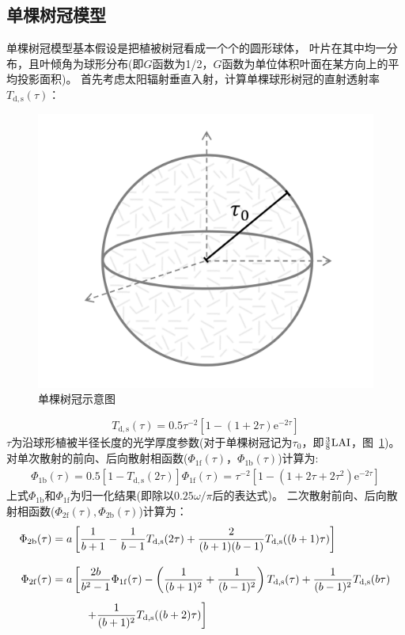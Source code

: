 \subsection{单棵树冠模型}
单棵树冠模型基本假设是把植被树冠看成一个个的圆形球体，
叶片在其中均一分布，且叶倾角为球形分布(即$G$函数为1/2，$G$函数为单位体积叶面在某方向上的平均投影面积)。
首先考虑太阳辐射垂直入射，计算单棵球形树冠的直射透射率$T_{\mathrm{d,s}}\left(\tau\right)$：
{
  \begin{figure}[htbp]
    \centering
    \includegraphics[width=0.6\columnwidth]{Figures/辐射过程及辐射通量计算/单棵树冠示意图.png}
    \caption{单棵树冠示意图}
    \label{fig:单棵树冠示意图}
  \end{figure}
}
%
\begin{equation}\label{T_ds_tau}
  T_{\mathrm{d, s}}(\tau)=0.5 \tau^{-2}\left[1-(1+2 \tau) {\mathrm e}^{-2 \tau}\right]
\end{equation}
$\tau$为沿球形植被半径长度的光学厚度参数(对于单棵树冠记为$\tau_0$，即$\frac{3}{8}\rm{LAI}$，图~\ref{fig:单棵树冠示意图})。对单次散射的前向、后向散射相函数($\Phi_{\mathrm{1f}}\left(\tau\right)$，$\Phi_{\mathrm{1b}}\left(\tau\right)$)计算为:
\begin{align}
  \Phi_{\mathrm{1 b}}(\tau)=0.5\left[1-T_{\mathrm{d, s}}(2 \tau)\right]
  \Phi_{\mathrm{1 f}}(\tau)=\tau^{-2}\left[1-\left(1+2 \tau+2 \tau^{2}\right) {\mathrm e}^{-2 \tau}\right]
\end{align}
上式$\Phi_{\mathrm{1b}}$和$\Phi_{\mathrm{1f}}$为归一化结果(即除以$0.25\omega/\pi$后的表达式)。
二次散射前向、后向散射相函数($\Phi_{\mathrm{2f}}\left(\tau\right), \Phi_{\mathrm{2b}}\left(\tau\right)$)计算为：
\begin{align}
  \Phi_{\mathrm{2 b}}(\tau) & =a\left[\frac{1}{b+1}-\frac{1}{b-1} T_{\mathrm{d, s}}(2 \tau)+\frac{2}{(b+1)(b-1)} T_{\mathrm{d, s}}((b+1) \tau)\right] \\[2ex]
%
  \Phi_{\mathrm{2 f}}(\tau) & =a\left[\frac{2 b}{b^{2}-1} \Phi_{\mathrm{1 f}}(\tau)-\left(\frac{1}{(b+1)^{2}}+\frac{1}{(b-1)^{2}}\right) T_{\mathrm{d, s}}(\tau)+\frac{1}{(b-1)^{2}} T_{\mathrm{d, s}}(b \tau)\right. \notag \\[1ex]
  &\qquad \left.\quad+\frac{1}{(b+1)^{2}} T_{\mathrm{d, s}}((b+2) \tau)\right]
\end{align}
